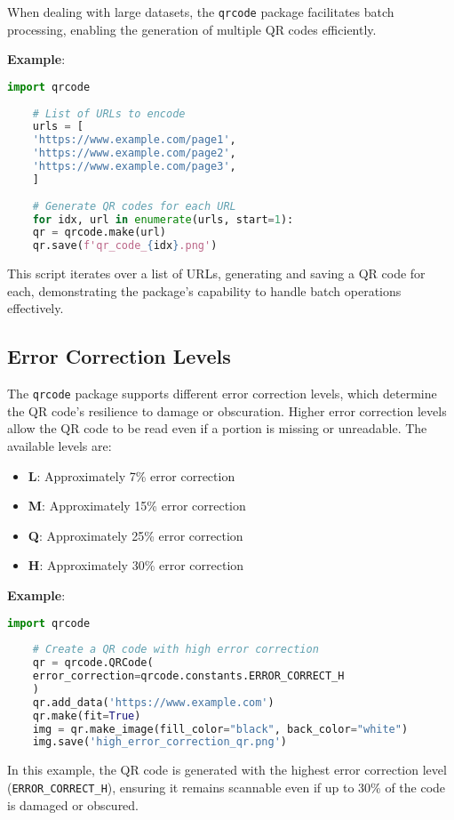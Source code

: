 When dealing with large datasets, the \texttt{qrcode} package facilitates batch processing, enabling the generation of multiple QR codes efficiently.

\textbf{Example}:
\begin{lstlisting}[language=Python]
	import qrcode
	
	# List of URLs to encode
	urls = [
	'https://www.example.com/page1',
	'https://www.example.com/page2',
	'https://www.example.com/page3',
	]
	
	# Generate QR codes for each URL
	for idx, url in enumerate(urls, start=1):
	qr = qrcode.make(url)
	qr.save(f'qr_code_{idx}.png')
\end{lstlisting}

This script iterates over a list of URLs, generating and saving a QR code for each, demonstrating the package's capability to handle batch operations effectively.

\subsection{Error Correction Levels}

The \texttt{qrcode} package supports different error correction levels, which determine the QR code's resilience to damage or obscuration. Higher error correction levels allow the QR code to be read even if a portion is missing or unreadable. The available levels are:

\begin{itemize}
	\item \textbf{L}: Approximately 7\% error correction
	\item \textbf{M}: Approximately 15\% error correction
	\item \textbf{Q}: Approximately 25\% error correction
	\item \textbf{H}: Approximately 30\% error correction
\end{itemize}

\textbf{Example}:
\begin{lstlisting}[language=Python]
	import qrcode
	
	# Create a QR code with high error correction
	qr = qrcode.QRCode(
	error_correction=qrcode.constants.ERROR_CORRECT_H
	)
	qr.add_data('https://www.example.com')
	qr.make(fit=True)
	img = qr.make_image(fill_color="black", back_color="white")
	img.save('high_error_correction_qr.png')
\end{lstlisting}

In this example, the QR code is generated with the highest error correction level (\texttt{ERROR\_CORRECT\_H}), ensuring it remains scannable even if up to 30\% of the code is damaged or obscured.

